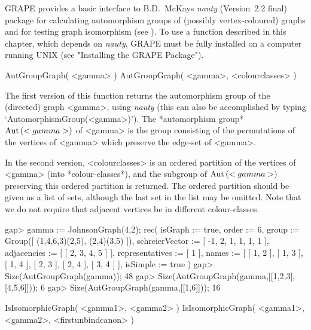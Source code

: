%
%
%
%
\def\GRAPE{\sf GRAPE}
\def\nauty{\it nauty}
\def\G{\Gamma}
\def\Aut{{\rm Aut}\,}
\def\x{\times}

{\GRAPE} provides a basic interface to B.D.~McKay{\pif}s {\nauty}
(Version~2.2 final) package for calculating automorphism groups of
(possibly vertex-coloured) graphs and for testing graph isomorphism (see
\cite{Nau90}). To use a function described in this chapter, which depends
on {\nauty}, {\GRAPE} must be fully installed on a computer running UNIX
(see "Installing the GRAPE Package").


\>AutGroupGraph( <gamma> )
\>AutGroupGraph( <gamma>, <colourclasses> )

The first version of this function returns the automorphism group of the
(directed) graph <gamma>, using {\nauty} (this can also be accomplished
by typing `AutomorphismGroup(<gamma>)'). The *automorphism group*
$\Aut(<gamma>)$ of <gamma> is the group consisting of the permutations
of the vertices of <gamma> which preserve the edge-set of <gamma>.

In the second version, <colourclasses> is an ordered partition of
the vertices of <gamma> (into *colour-classes*), and the subgroup
of $\Aut(<gamma>)$ preserving this ordered partition is returned. The
ordered partition should be given as a list of sets, although the last
set in the list may be omitted.  Note that we do not require that adjacent
vertices be in different colour-classes.

\beginexample
gap> gamma := JohnsonGraph(4,2);                   
rec( isGraph := true, order := 6, 
  group := Group([ (1,4,6,3)(2,5), (2,4)(3,5) ]), 
  schreierVector := [ -1, 2, 1, 1, 1, 1 ], adjacencies := [ [ 2, 3, 4, 5 ] ], 
  representatives := [ 1 ], 
  names := [ [ 1, 2 ], [ 1, 3 ], [ 1, 4 ], [ 2, 3 ], [ 2, 4 ], [ 3, 4 ] ], 
  isSimple := true )
gap> Size(AutGroupGraph(gamma)); 
48
gap> Size(AutGroupGraph(gamma,[[1,2,3],[4,5,6]])); 
6
gap> Size(AutGroupGraph(gamma,[[1,6]]));          
16
\endexample


\>IsIsomorphicGraph( <gamma1>, <gamma2> )
\>IsIsomorphicGraph( <gamma1>, <gamma2>, <firstunbindcanon> )

